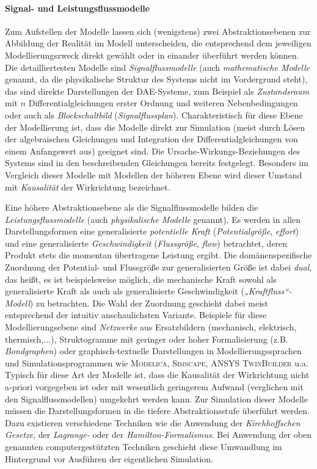 \paragraph{Signal- und Leistungsflussmodelle} Zum Aufstellen der Modelle lassen sich (wenigstens) zwei Abstraktionsebenen zur Abbildung der Realität im Modell unterscheiden, die entsprechend dem jeweiligen Modellierungszweck direkt gewählt oder in einander überführt werden können. Die detailliertesten Modelle sind \emph{Signalflussmodelle} (auch \emph{mathematische Modelle} genannt, da die physikalische Struktur des Systems nicht im Vordergrund steht), das sind direkte Darstellungen der DAE-Systeme, zum Beispiel als \emph{Zustandsraum} mit $n$ Differentialgleichungen erster Ordnung und weiteren Nebenbedingungen oder auch als \emph{Blockschaltbild} (\emph{Signalflussplan}). Charakteristisch für diese Ebene der Modellierung ist, dass die Modelle direkt zur Simulation (meist durch Lösen der algebraischen Gleichungen und Integration der Differentialgleichungen von einem Anfangswert aus) geeignet sind. Die Ursache-Wirkungs-Beziehungen des Systems sind in den beschreibenden Gleichungen bereits festgelegt. Besonders im Vergleich dieser Modelle mit Modellen der höheren Ebene wird dieser Umstand mit \emph{Kausalität} der Wirkrichtung bezeichnet.

Eine höhere Abstraktionsebene als die Signalflussmodelle bilden die \emph{Leistungsflussmodelle} (auch \emph{physikalische Modelle} genannt). Es werden in allen Darstellungsformen eine generalisierte \emph{potentielle Kraft} (\emph{Potentialgröße}, \emph{effort}) und eine generalisierte \emph{Geschwindigkeit} (\emph{Flussgröße}, \emph{flow}) betrachtet, deren Produkt stets die momentan übertragene Leistung ergibt. Die domänenspezifische Zuordnung der Potential- und Flussgröße zur generalisierten Größe ist dabei \emph{dual}, das heißt, es ist beispielsweise möglich, die mechanische Kraft sowohl als generalisierte Kraft als auch als generalisierte Geschwindigkeit (\emph{„Kraftfluss“-Modell}) zu betrachten. Die Wahl der Zuordnung geschieht dabei meist entsprechend der intuitiv anschaulichsten Variante. Beispiele für diese Modellierungsebene sind \emph{Netzwerke} aus Ersatzbildern (mechanisch, elektrisch, thermisch,...), Struktogramme mit geringer oder hoher Formalisierung (z.B. \emph{Bondgraphen}) oder graphisch-textuelle Darstellungen in Modellierungssprachen und Simulationsprogrammen wie \textsc{Modelica}, \textsc{Simscape}, \textsc{ANSYS TwinBuilder} u.a. Typisch für diese Art der Modelle ist, dass die Kausalität der Wirkrichtung nicht a-priori vorgegeben ist oder mit wesentlich geringerem Aufwand (verglichen mit den Signalflussmodellen) umgekehrt werden kann. Zur Simulation dieser Modelle müssen die Darstellungsformen in die tiefere Abstraktionsstufe überführt werden. Dazu existieren verschiedene Techniken wie die Anwendung der \emph{Kirchhoffschen Gesetze}, der \emph{Lagrange-} oder der \emph{Hamilton-Formalismus}. Bei Anwendung der oben genannten computergestützten Techniken geschieht diese Umwandlung im Hintergrund vor Ausführen der eigentlichen Simulation. 

